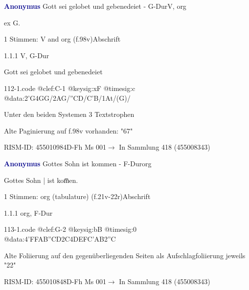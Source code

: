 \documentclass[twocolumn]{book}
\begin{document}
\par \vspace{7pt} \textcolor{darkblue}{\textbf{Anonymus  }}\hfillplus{\textbf{[112]}}\newline Gott sei gelobet und gebenedeiet - G-Dur\newline V, org
\par \begin{itshape}[f.96r, at left:] ex G.\end{itshape} 
\par \textcolor{darkblue}{}  1 Stimmen: V and org  (f.98v)\newline Abschrift
\par 1.1.1  V, G-Dur\newline \begin{footnotesize} Gott sei gelobet und gebenedeiet \end{footnotesize}  
\begin{filecontents*}{112-1.code}
@clef:C-1
@keysig:xF
@timesig:c
@data:2'G4GG/2AG/''CD/C'B/1At/(G)/
\end{filecontents*}
\newline
%
\par Unter den beiden Systemen 3 Textstrophen
\par Alte Paginierung auf f.98v vorhanden: "67"
\par RISM-ID: 455010984\newline D-Fh  Ms 001\newline $\rightarrow$ In Sammlung 418 (455008343)
      
\par \vspace{7pt} \textcolor{darkblue}{\textbf{Anonymus  }}\hfillplus{\textbf{[113]}}\newline Gottes Sohn ist kommen - F-Dur\newline org
\par \begin{itshape}[f.21v, at left:] Gottes Sohn | ist kom̅en.\end{itshape} 
\par \textcolor{darkblue}{}  1 Stimmen: org (tabulature)  (f.21v-22r)\newline Abschrift
\par 1.1.1  org, F-Dur  
\begin{filecontents*}{113-1.code}
@clef:G-2
@keysig:bB
@timesig:0
@data:4'FFAB''CD2C4DEFC'AB2''C
\end{filecontents*}
\newline
%
\par Alte Foliierung auf den gegenüberliegenden Seiten als Aufschlagfoliierung jeweils "22"
\par RISM-ID: 455010848\newline D-Fh  Ms 001\newline $\rightarrow$ In Sammlung 418 (455008343)
      
\end{document}
